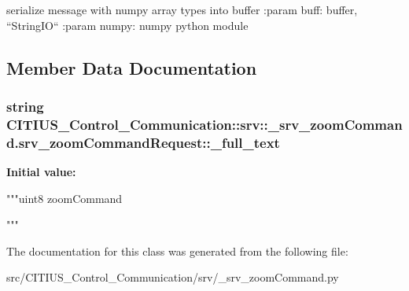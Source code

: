 \begin{DoxyVerb}
serialize message with numpy array types into buffer
:param buff: buffer, ``StringIO``
:param numpy: numpy python module
\end{DoxyVerb}
 

\subsection{\-Member \-Data \-Documentation}
\hypertarget{class_c_i_t_i_u_s___control___communication_1_1srv_1_1__srv__zoom_command_1_1srv__zoom_command_request_a85866239b05b81d45b719fd43e318bc2}{
\subsubsection[{\-\_\-full\-\_\-text}]{\setlength{\rightskip}{0pt plus 5cm}string \-C\-I\-T\-I\-U\-S\-\_\-\-Control\-\_\-\-Communication\-::srv\-::\-\_\-srv\-\_\-zoom\-Command.\-srv\-\_\-zoom\-Command\-Request\-::\-\_\-full\-\_\-text}}\label{class_c_i_t_i_u_s___control___communication_1_1srv_1_1__srv__zoom_command_1_1srv__zoom_command_request_a85866239b05b81d45b719fd43e318bc2}
{\bfseries \-Initial value\-:}
\begin{DoxyCode}
"""uint8 zoomCommand

"""
\end{DoxyCode}


\-The documentation for this class was generated from the following file\-:\begin{DoxyCompactItemize}
\item 
src/\-C\-I\-T\-I\-U\-S\-\_\-\-Control\-\_\-\-Communication/srv/\-\_\-srv\-\_\-zoom\-Command.\-py\end{DoxyCompactItemize}
